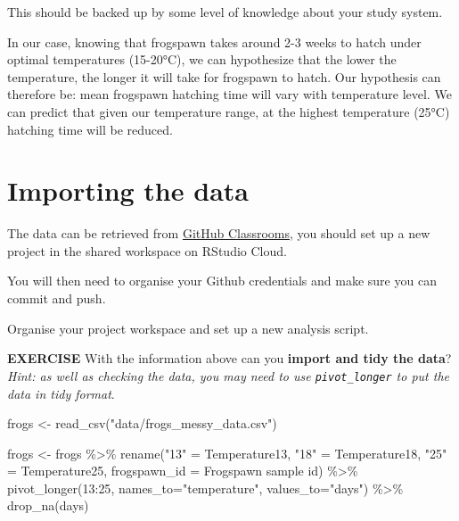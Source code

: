 \documentclass[
]{book}
\newenvironment{Shaded}{\begin{snugshade}}{\end{snugshade}}
\newcommand{\AttributeTok}[1]{\textcolor[rgb]{0.77,0.63,0.00}{#1}}
\newcommand{\FunctionTok}[1]{\textcolor[rgb]{0.00,0.00,0.00}{#1}}
\newcommand{\NormalTok}[1]{#1}
\newcommand{\OtherTok}[1]{\textcolor[rgb]{0.56,0.35,0.01}{#1}}
\newcommand{\SpecialCharTok}[1]{\textcolor[rgb]{0.00,0.00,0.00}{#1}}
\newcommand{\StringTok}[1]{\textcolor[rgb]{0.31,0.60,0.02}{#1}}
\begin{document}
This should be backed up by some level of knowledge about your study system.

In our case, knowing that frogspawn takes around 2-3 weeks to hatch under optimal temperatures (15-20°C), we can hypothesize that the lower the temperature, the longer it will take for frogspawn to hatch. Our hypothesis can therefore be: mean frogspawn hatching time will vary with temperature level. We can predict that given our temperature range, at the highest temperature (25°C) hatching time will be reduced.

\hypertarget{importing-the-data}{%
\section{Importing the data}\label{importing-the-data}}

The data can be retrieved from \href{https://classroom.github.com/a/KZvnm46x}{GitHub Classrooms}, you should set up a new project in the shared workspace on RStudio Cloud.

You will then need to organise your Github credentials and make sure you can commit and push.

Organise your project workspace and set up a new analysis script.

\textbf{EXERCISE } With the information above can you \textbf{import and tidy the data}? \emph{Hint: as well as checking the data, you may need to use \texttt{pivot\_longer} to put the data in tidy format}.

\begin{Shaded}
\begin{Highlighting}[]
\NormalTok{frogs }\OtherTok{\textless{}{-}} \FunctionTok{read\_csv}\NormalTok{(}\StringTok{"data/frogs\_messy\_data.csv"}\NormalTok{)}
\end{Highlighting}
\end{Shaded}

\begin{Shaded}
\begin{Highlighting}[]
\NormalTok{frogs }\OtherTok{\textless{}{-}}\NormalTok{ frogs }\SpecialCharTok{\%\textgreater{}\%} 
  \FunctionTok{rename}\NormalTok{(}\StringTok{"13"} \OtherTok{=}\NormalTok{ Temperature13,}
         \StringTok{"18"} \OtherTok{=}\NormalTok{ Temperature18,}
         \StringTok{"25"} \OtherTok{=}\NormalTok{ Temperature25,}
         \AttributeTok{frogspawn\_id =} \StringTok{\textasciigrave{}}\AttributeTok{Frogspawn sample id}\StringTok{\textasciigrave{}}\NormalTok{) }\SpecialCharTok{\%\textgreater{}\%} 
  \FunctionTok{pivot\_longer}\NormalTok{(}\StringTok{\textasciigrave{}}\AttributeTok{13}\StringTok{\textasciigrave{}}\SpecialCharTok{:}\StringTok{\textasciigrave{}}\AttributeTok{25}\StringTok{\textasciigrave{}}\NormalTok{, }\AttributeTok{names\_to=}\StringTok{"temperature"}\NormalTok{, }\AttributeTok{values\_to=}\StringTok{"days"}\NormalTok{) }\SpecialCharTok{\%\textgreater{}\%} 
  \FunctionTok{drop\_na}\NormalTok{(days)}
\end{Highlighting}
\end{Shaded}
\end{document}
